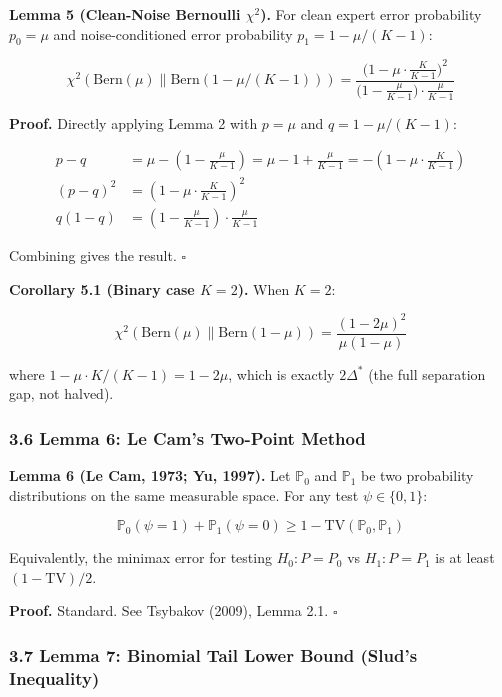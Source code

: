 \documentclass[
  12pt,
]{ctexart}
\begin{document}
\textbf{Lemma 5 (Clean-Noise Bernoulli \(\chi^2\)).} For clean expert
error probability \(p_0 = \mu\) and noise-conditioned error probability
\(p_1 = 1 - \mu/(K-1)\):

\[\chi^2(\text{Bern}(\mu) \parallel \text{Bern}(1-\mu/(K-1))) = \frac{\bigl(1 - \mu \cdot \frac{K}{K-1}\bigr)^2}{\bigl(1 - \frac{\mu}{K-1}\bigr) \cdot \frac{\mu}{K-1}}\]

\textbf{Proof.} Directly applying Lemma 2 with \(p = \mu\) and
\(q = 1 - \mu/(K-1)\):

\[\begin{aligned}
p - q &= \mu - \left(1 - \frac{\mu}{K-1}\right) = \mu - 1 + \frac{\mu}{K-1} = -\left(1 - \mu \cdot \frac{K}{K-1}\right) \\
(p-q)^2 &= \left(1 - \mu \cdot \frac{K}{K-1}\right)^2 \\
q(1-q) &= \left(1 - \frac{\mu}{K-1}\right) \cdot \frac{\mu}{K-1}
\end{aligned}\]

Combining gives the result. \(\square\)

\textbf{Corollary 5.1 (Binary case \(K=2\)).} When \(K=2\):

\[\chi^2(\text{Bern}(\mu) \parallel \text{Bern}(1-\mu)) = \frac{(1 - 2\mu)^2}{\mu(1-\mu)}\]

where \(1 - \mu \cdot K/(K-1) = 1 - 2\mu\), which is exactly
\(2\Delta^*\) (the full separation gap, not halved).

\subsubsection{3.6 Lemma 6: Le Cam's Two-Point
Method}\label{lemma-6-le-cams-two-point-method}

\textbf{Lemma 6 (Le Cam, 1973; Yu, 1997).} Let \(\mathbb{P}_0\) and
\(\mathbb{P}_1\) be two probability distributions on the same measurable
space. For any test \(\psi \in \{0,1\}\):

\[\mathbb{P}_0(\psi = 1) + \mathbb{P}_1(\psi = 0) \geq 1 - \text{TV}(\mathbb{P}_0, \mathbb{P}_1)\]

Equivalently, the minimax error for testing \(H_0: P = P_0\) vs
\(H_1: P = P_1\) is at least \((1 - \text{TV})/2\).

\textbf{Proof.} Standard. See Tsybakov (2009), Lemma 2.1. \(\square\)

\subsubsection{3.7 Lemma 7: Binomial Tail Lower Bound (Slud's
Inequality)}\label{lemma-7-binomial-tail-lower-bound-sluds-inequality}
\end{document}
